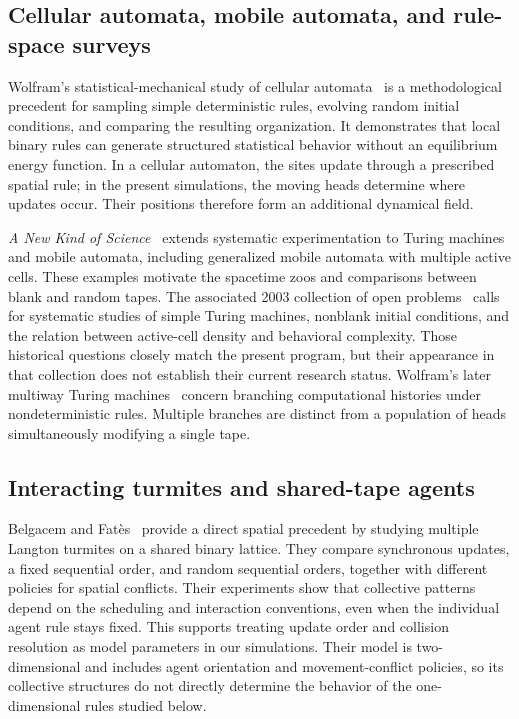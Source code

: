 \documentclass{article}
\begin{document}
\subsection{Cellular automata, mobile automata, and rule-space surveys}

Wolfram's statistical-mechanical study of cellular
automata~\citep{wolfram1983statistical} is a methodological precedent for
sampling simple deterministic rules, evolving random initial conditions,
and comparing the resulting organization.  It demonstrates that local
binary rules can generate structured statistical behavior without an
equilibrium energy function.  In a cellular automaton, the sites update
through a prescribed spatial rule; in the present simulations, the moving
heads determine where updates occur.  Their positions therefore form an
additional dynamical field.

\emph{A New Kind of Science}~\citep{wolfram2002nks} extends systematic
experimentation to Turing machines and mobile automata, including generalized
mobile automata with multiple active cells.  These examples motivate the
spacetime zoos and comparisons between blank and random tapes.  The
associated 2003 collection of open problems~\citep{wolfram2003open} calls
for systematic studies of simple Turing machines, nonblank initial
conditions, and the relation between active-cell density and behavioral
complexity.  Those historical questions closely match the present program,
but their appearance in that collection does not establish their current
research status.  Wolfram's later multiway Turing
machines~\citep{wolfram2021multiway} concern branching computational
histories under nondeterministic rules.  Multiple branches are distinct
from a population of heads simultaneously modifying a single tape.

\subsection{Interacting turmites and shared-tape agents}

Belgacem and Fat\`es~\citep{belgacem2012turmites} provide a direct spatial
precedent by studying multiple Langton turmites on a shared binary lattice.
They compare synchronous updates, a fixed sequential order, and random
sequential orders, together with different policies for spatial conflicts.
Their experiments show that collective patterns depend on the scheduling
and interaction conventions, even when the individual agent rule stays
fixed.  This supports treating update order and collision resolution as
model parameters in our simulations.  Their model is two-dimensional and
includes agent orientation and movement-conflict policies, so its
collective structures do not directly determine the behavior of the
one-dimensional rules studied below.
\end{document}

